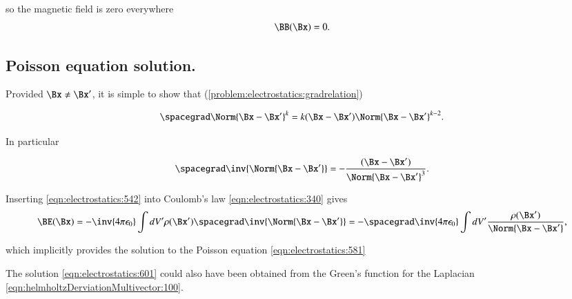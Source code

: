 so the magnetic field is zero everywhere
\begin{dmath}\label{eqn:electrostatics:320}
\BB(\Bx) = 0.
\end{dmath}


\subsection{Poisson equation solution.}

Provided \( \Bx \ne \Bx' \), it is simple to show that (\cref{problem:electrostatics:gradrelation})

\begin{dmath}\label{eqn:electrostatics:541}
\spacegrad \Norm{\Bx - \Bx'}^k = k (\Bx - \Bx') \Norm{ \Bx - \Bx' }^{k-2}.
\end{dmath}

In particular

\begin{dmath}\label{eqn:electrostatics:542}
\spacegrad \inv{\Norm{\Bx - \Bx'}} = - \frac{(\Bx - \Bx')}{\Norm{ \Bx - \Bx' }^{3}}.
\end{dmath}

Inserting \cref{eqn:electrostatics:542} into Coulomb's law \cref{eqn:electrostatics:340} gives
\begin{dmath}\label{eqn:electrostatics:661}
\BE(\Bx)
=
-\inv{4 \pi \epsilon_0} \int dV' \rho(\Bx') \spacegrad \inv{\Norm{\Bx - \Bx'}}
=
- \spacegrad \inv{4 \pi \epsilon_0} \int dV' \frac{\rho(\Bx')}{\Norm{\Bx - \Bx'}},
\end{dmath}

which implicitly provides the solution to the Poisson equation \cref{eqn:electrostatics:581}


The solution \cref{eqn:electrostatics:601} could also have been obtained from the Green's function for the Laplacian 
\cref{eqn:helmholtzDerviationMultivector:100}.
